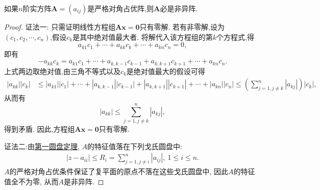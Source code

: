 \documentclass[../../main.tex]{subfiles}
\begin{document}
\begin{proposition}[严格对角占优阵必是非异阵]\label{proposition:严格对角占优阵必是非异阵}
如果\(n\)阶实方阵\(\boldsymbol{A}=(a_{ij})\)是严格对角占优阵,则\(\boldsymbol{A}\)必是非异阵.
\end{proposition}
\begin{proof}
{\color{blue}证法一:}
只需证明线性方程组\(\boldsymbol{A}\boldsymbol{x}=\boldsymbol{0}\)只有零解. 若有非零解,设为\((c_1,c_2,\cdots,c_n)\),假设\(c_k\)是其中绝对值最大者. 将解代入该方程组的第\(k\)个方程式,得
\[
a_{k1}c_1+\cdots + a_{kk}c_k+\cdots + a_{kn}c_n = 0,
\]
即有
\[
-a_{kk}c_k=a_{k1}c_1+\cdots + a_{k,k - 1}c_{k - 1}+a_{k,k + 1}c_{k + 1}+\cdots + a_{kn}c_n.
\]
上式两边取绝对值,由三角不等式以及\(c_k\)是绝对值最大的假设可得
\begin{align*}
|a_{kk}||c_k|&\leqslant |a_{k1}||c_1|+\cdots + |a_{k,k - 1}||c_{k - 1}|+|a_{k,k + 1}||c_{k + 1}|+\cdots + |a_{kn}||c_n|\leqslant \left(\sum_{j = 1,j\neq k}^{n}|a_{kj}|\right)|c_k|,
\end{align*}
从而有
\[
|a_{kk}|\leqslant \sum_{j = 1,j\neq k}^{n}|a_{kj}|,
\]
得到矛盾. 因此,方程组\(\boldsymbol{A}\boldsymbol{x}=\boldsymbol{0}\)只有零解.

{\color{blue}证法二:}由\hyperref[theorem:第一圆盘定理]{第一圆盘定理}, \(A\)的特征值落在下列戈氏圆盘中:
\begin{align*}
|z - a_{ii}| \leqslant  R_{i} = \sum_{j = 1,j\neq i}^{n}|a_{ij}|,\ 1 \leqslant  i \leqslant  n.
\end{align*}
\(A\)的严格对角占优条件保证了复平面的原点不落在这些戈氏圆盘中, 因此\(A\)的特征值全不为零, 从而\(A\)是非异阵.

\end{proof}
\end{document}
